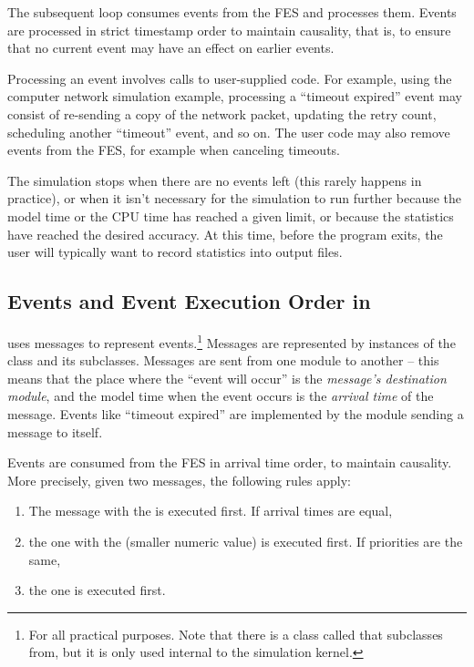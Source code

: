 The subsequent loop consumes events from the FES and processes
them. Events are processed in strict timestamp order
to maintain causality, that is, to ensure that no current event may have
an effect on earlier events.

Processing an event involves calls to user-supplied code. For example,
using the computer network simulation example, processing a ``timeout
expired'' event may consist of re-sending a copy of the network
packet, updating the retry count, scheduling another ``timeout''
event, and so on. The user code may also remove events from the FES,
for example when canceling timeouts.

The simulation stops when there are no events left (this rarely happens
in practice), or when it isn't necessary for the simulation
to run further because the model time or the CPU time has reached
a given limit, or because the statistics have reached the desired
accuracy. At this time, before the program exits, the user
will typically want to record statistics into output files.


\subsection{Events and Event Execution Order in {\opp}}
\label{sec:simple-modules:events-in-opp}

{\opp} uses messages to represent
events.\footnote{For all practical purposes. Note that there
is a class called  that  subclasses from,
but it is only used internal to the simulation kernel.}
Messages are represented by instances of the  class
and its subclasses. Messages are sent from one module to another -- this
means that the place where the ``event will occur'' is the
\textit{message's destination module}, and the model time when the
event occurs is the \textit{arrival time} of the
message. Events like ``timeout expired'' are implemented by the
module sending a message to itself.

Events are consumed from the FES in arrival time order, to
maintain causality. More precisely, given two messages, the following
rules apply:

\begin{enumerate}
\item The message with the  is executed
    first. If arrival times are equal,
\item the one with the  (smaller
    numeric value) is executed first. If priorities are the same,
\item the one  is executed first.
\end{enumerate}

